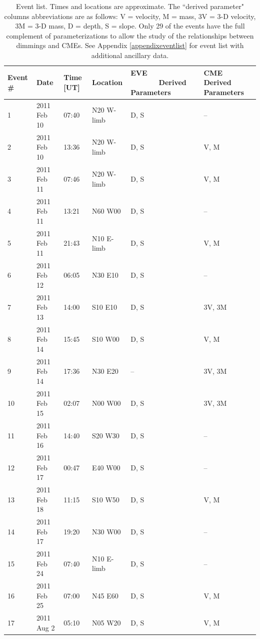 \newpage
\begin{singlespace}
\begin{table}[H]
    \caption[Semi-statistical study event list]{
        Event list. Times and locations are approximate. The ``derived parameter" columns abbreviations are as follows: V = 
        velocity, M = mass, 3V = 3-D velocity, 3M = 3-D mass, D = depth, S = slope. Only 29 of the events have the full 
        complement of parameterizations to allow the study of the relationships between dimmings and CMEs. 
        See Appendix \ref{appendixeventlist} for event list with additional ancillary data. 
    }
    \begin{center}
    \begin{tabular}{|l|l|l|l|p{2.0cm}|p{2.0cm}|} \hline
	Event \# & Date & Time [UT] & Location & EVE \ \ \ \ \ \ \ Derived Parameters & CME Derived Parameters \\ \hline \hline
	1 & 2011 Feb 10 & 07:40 & N20 W-limb & D, S & -- \\ \hline
	2 & 2011 Feb 10 & 13:36 & N20 W-limb & D, S & V, M  \\ \hline
	3 & 2011 Feb 11 & 07:46 & N20 W-limb & D, S & V, M \\ \hline
	4 & 2011 Feb 11 & 13:21 & N60 W00 & D, S & -- \\ \hline
	5 & 2011 Feb 11 & 21:43 & N10 E-limb & D, S & V, M \\ \hline
	6 & 2011 Feb 12 & 06:05 & N30 E10 & D, S & -- \\ \hline
	7 & 2011 Feb 13 & 14:00 & S10 E10 & D, S & 3V, 3M \\ \hline
	8 & 2011 Feb 14 & 15:45 & S10 W00 & D, S & V, M \\ \hline
	9 & 2011 Feb 14 & 17:36 & N30 E20 & -- & 3V, 3M \\ \hline
	10 & 2011 Feb 15 & 02:07 & N00 W00 & D, S & 3V, 3M \\ \hline
	11 & 2011 Feb 16 & 14:40 & S20 W30 & D, S & -- \\ \hline
	12 & 2011 Feb 17 & 00:47 & E40 W00 & D, S & -- \\ \hline
	13 & 2011 Feb 18 & 11:15 & S10 W50 & D, S & V, M \\ \hline
	14 & 2011 Feb 17 & 19:20 & N30 W00 & D, S & -- \\ \hline
	15 & 2011 Feb 24 & 07:40 & N10 E-limb & D, S & -- \\ \hline
	16 & 2011 Feb 25 & 07:00 & N45 E60 & D, S & V, M \\ \hline
	17 & 2011 Aug 2 & 05:10 & N05 W20 & D, S & V, M \\ \hline

\end{tabular}
\end{center}
\end{table}
\end{singlespace}
